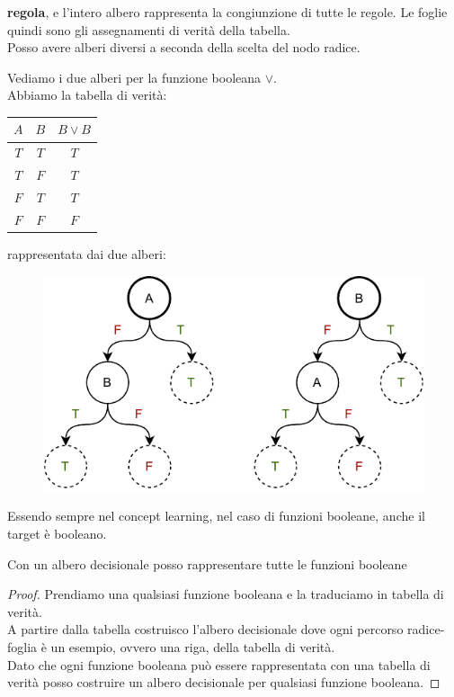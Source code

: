 \textbf{regola}, e l'intero albero rappresenta la congiunzione di tutte le
regole. Le foglie quindi sono gli assegnamenti di verità della tabella.\\ 
Posso avere alberi diversi a seconda della scelta del nodo radice.\\
\begin{esempio}
  Vediamo i due alberi per la funzione booleana $\lor$.\\
  Abbiamo la tabella di verità:
  \begin{table}[H]
    \centering
    \begin{tabular}{c|c|c}
      $A$ & $B$ & $B\lor B$\\
      \hline
      $T$ & $T$ & $T$\\
      $T$ & $F$ & $T$\\
      $F$ & $T$ & $T$\\
      $F$ & $F$ & $F$
    \end{tabular}
  \end{table}
  rappresentata dai due alberi:
  \begin{figure}[H]
    \centering
    \includegraphics[scale = 0.9]{img/dt1.pdf}
  \end{figure}
\end{esempio}
Essendo sempre nel concept learning, nel caso di funzioni booleane, anche il
target è booleano.
\begin{definizione}
  Con un albero decisionale posso rappresentare tutte le
  funzioni booleane
\end{definizione}
\begin{proof}
  Prendiamo una qualsiasi funzione booleana e la traduciamo in tabella di
  verità.\\
  A partire dalla tabella costruisco l'albero decisionale dove ogni percorso
  radice-foglia è un esempio, ovvero una riga, della tabella di verità.\\
  Dato che ogni funzione booleana può essere rappresentata con una tabella di
  verità posso costruire un albero decisionale per qualsiasi funzione booleana.
\end{proof}
